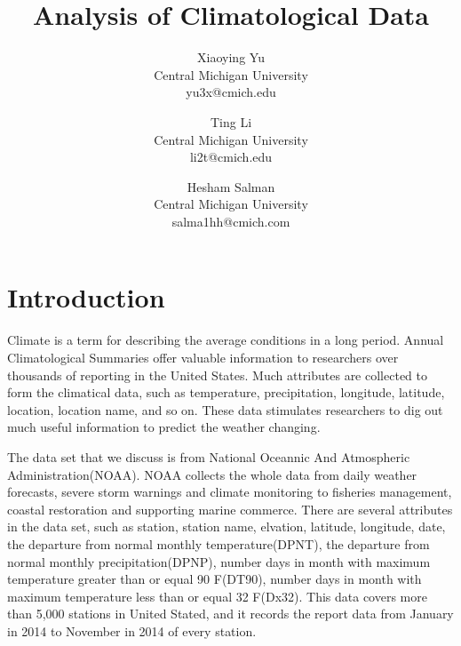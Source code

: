 \documentclass[11pt]{article}
\begin{document}
\title{Analysis of Climatological Data}
\author{Xiaoying Yu\\Central Michigan University\\yu3x@cmich.edu
\and Ting Li\\Central Michigan University\\li2t@cmich.edu
\and Hesham Salman\\Central Michigan University\\salma1hh@cmich.com}
\maketitle
\newpage
\begin{abstract}
\end{abstract}
\newpage
\section{Introduction}
Climate is a term for describing the average conditions in a long period. Annual Climatological Summaries offer valuable information to researchers over thousands of reporting in the United States. Much attributes are collected to form the climatical data, such as temperature, precipitation, longitude, latitude, location, location name, and so on. These data stimulates researchers to dig out much useful information to predict the weather changing.

The data set that we discuss is from National Oceannic And Atmospheric Administration(NOAA)\cite{center2010national}. NOAA collects the whole data from daily weather forecasts, severe storm warnings and climate monitoring to fisheries management, coastal restoration and supporting marine commerce\cite{center2010national}.  There are several attributes in the data set, such as station, station name, elvation, latitude, longitude, date, the departure from normal monthly temperature(DPNT), the departure from normal monthly precipitation(DPNP), number days in month with maximum temperature greater than or equal 90 F(DT90), number days in month with maximum temperature less than or equal 32 F(Dx32). This data covers more than 5,000 stations in United Stated, and it records the report data from January in 2014 to November in 2014 of every station.
\end{document}
